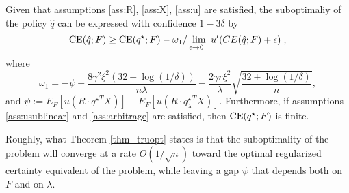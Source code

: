 \begin{thm}
  \label{thm_truopt}
  Given that assumptions \ref{ass:R}, \ref{ass:X}, \ref{ass:u} are satisfied, the
  suboptimaliy of the policy $\hat q$ can be expressed with confidence $1-3\delta$ by
  \[
    \operatorname{CE}(\hat q;F) \geq \operatorname{CE}(q^\star;F) - \omega_1/\lim_{\epsilon\to0^{-}}u'(CE(\hat q;F)+\epsilon)\;,
  \]
  where
  \[
    \omega_1 = -\psi -\frac{8\gamma^2\xi^2(32+\log(1/\delta))}{n\lambda} -\frac{2\gamma\bar
    r\xi^2}{\lambda}\sqrt{\frac{32+\log(1/\delta)}{n}},
  \]
  and $\psi:=E_F[u(R\cdot {q^{\star}}^T X)] - E_F[u(R\cdot {q^\star_\lambda}^TX)]$.
  Furthermore, if assumptions \ref{ass:usublinear} and \ref{ass:arbitrage} are satisfied, then
  $\operatorname{CE}(q^\star;F)$ is finite. 
\end{thm}

Roughly, what Theorem \ref{thm_truopt} states is that the suboptimality of the problem
will converge at a rate $O(1/\sqrt{n})$ toward the optimal regularized certainty
equivalent of the problem, while leaving a gap $\psi$ that depends both on $F$ and on
$\lambda$.


